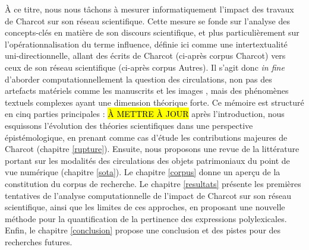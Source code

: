 À ce titre, nous nous tâchons à mesurer informatiquement l'impact des travaux de Charcot sur son réseau scientifique. Cette mesure se fonde sur l'analyse des concepts-clés en matière de son discours scientifique, et plus particulièrement sur l'opérationnalisation du terme \og{}influence\fg{}, définie ici comme une intertextualité uni-directionnelle, allant des écrits de Charcot (ci-après corpus \og{}Charcot\fg{}) vers ceux de son réseau scientifique (ci-après corpus \og{}Autres\fg{}). Il s'agit donc \textit{in fine} d'aborder computationnellement la question des circulations, non pas des artefacts matériels comme les manuscrits \citep{gabay2021katabase} et les images \citep{joyeux2019visual}, mais des phénomènes textuels complexes \citep{manjavacas} ayant une dimension théorique forte. Ce mémoire est structuré en cinq parties principales : \hl{À METTRE À JOUR} après l'introduction, nous esquissons l'évolution des théories scientifiques dans une perspective épistémologique, en prenant comme cas d'étude les contributions majeures de Charcot (chapitre \ref{rupture}).
Ensuite, nous proposons une revue de la littérature portant sur les modalités des circulations des objets patrimoniaux du point de vue numérique (chapitre \ref{sota}). Le chapitre \ref{corpus} donne un aperçu de la constitution du corpus de recherche. Le chapitre \ref{resultats} présente les premières tentatives de l'analyse computationnelle de l'impact de Charcot sur son réseau scientifique, ainsi que les limites de ces approches, en proposant une nouvelle méthode pour la quantification de la pertinence des expressions polylexicales. Enfin, le chapitre \ref{conclusion} propose une conclusion et des pistes pour des recherches futures.


